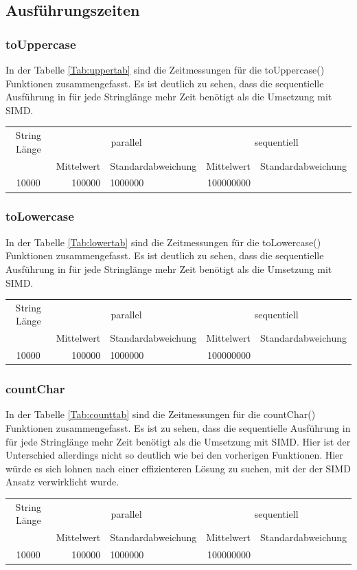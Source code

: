 \documentclass[plainarticle,zihtitle,german,final,hyperref,utf8]{zihpub}
\begin{document}
\subsection{Ausführungszeiten}
\subsubsection{toUppercase}
In der Tabelle \ref{Tab:uppertab} sind die Zeitmessungen für die toUppercase() Funktionen zusammengefasst.
Es ist deutlich zu sehen, dass die sequentielle Ausführung in für jede Stringlänge mehr Zeit benötigt als die Umsetzung mit SIMD.
\newline
\begin{tabular}{|c|r|l|r|l|}
	\hline
	\multicolumn{1}{|c|}{String Länge} & \multicolumn{2}{c|}{parallel} & \multicolumn{2}{c|}{sequentiell} \\
	\cline{2-5}
	& Mittelwert & Standardabweichung  & Mittelwert & Standardabweichung \\
	\hline
	10000& 		
	100000&		
	1000000&	
	100000000&	
\end{tabular}
\label{Tab:uppertab}


\subsubsection{toLowercase}
In der Tabelle \ref{Tab:lowertab} sind die Zeitmessungen für die toLowercase() Funktionen zusammengefasst.
Es ist deutlich zu sehen, dass die sequentielle Ausführung in für jede Stringlänge mehr Zeit benötigt als die Umsetzung mit SIMD.
\newline
\begin{tabular}{|c|r|l|r|l|}
	\hline
	\multicolumn{1}{|c|}{String Länge} & \multicolumn{2}{c|}{parallel} & \multicolumn{2}{c|}{sequentiell} \\
	\cline{2-5}
	& Mittelwert & Standardabweichung  & Mittelwert & Standardabweichung \\
	\hline
	10000& 		
	100000&		
	1000000&	
	100000000&	
\end{tabular}
\label{Tab:lowertab}

\subsubsection{countChar}
In der Tabelle \ref{Tab:counttab} sind die Zeitmessungen für die countChar() Funktionen zusammengefasst.
Es ist zu sehen, dass die sequentielle Ausführung in für jede Stringlänge mehr Zeit benötigt als die Umsetzung mit SIMD. Hier ist der Unterschied allerdings nicht so deutlich wie bei den vorherigen Funktionen. Hier würde es sich lohnen nach einer effizienteren Lösung zu suchen, mit der der SIMD Ansatz verwirklicht wurde.
\newline
\begin{tabular}{|c|r|l|r|l|}
	\hline
	\multicolumn{1}{|c|}{String Länge} & \multicolumn{2}{c|}{parallel} & \multicolumn{2}{c|}{sequentiell} \\
	\cline{2-5}
	& Mittelwert & Standardabweichung  & Mittelwert & Standardabweichung \\
	\hline
	10000& 		
	100000&		
	1000000&	
	100000000&	
\end{tabular}
\label{Tab:counttab}
\end{document}
